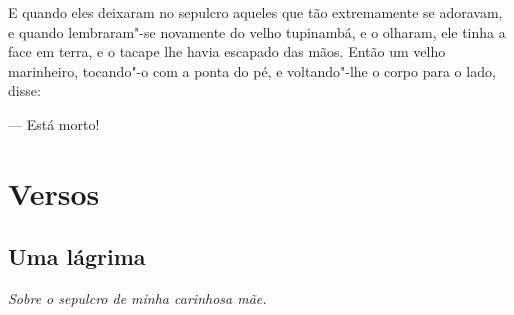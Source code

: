 E quando eles deixaram no sepulcro aqueles que tão extremamente se
adoravam, e quando lembraram"-se novamente do velho tupinambá, e o
olharam, ele tinha a face em terra, e o tacape lhe havia escapado das
mãos. Então um velho marinheiro, tocando"-o com a ponta do pé, e
voltando"-lhe o corpo para o lado, disse:

--- Está morto!

\part{Versos}

\chapter{Uma lágrima}

\hfill{}\emph{Sobre o sepulcro de minha carinhosa mãe.}

